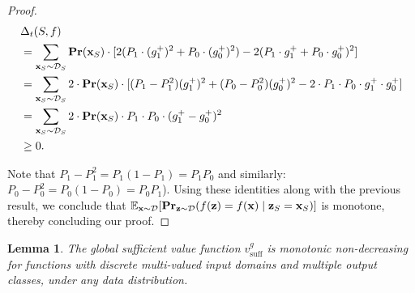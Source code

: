 \documentclass{article}
\newtheorem{lemma}{Lemma}
\newcommand{\z}{\textbf{z}}
\newcommand{\x}{\textbf{x}}
\newcommand{\fml}[1]{{\mathcal{#1}}}
\newcommand{\mbf}[1]{\ensuremath\mathbf{#1}}
\newcommand{\mbb}[1]{\ensuremath\mathbb{#1}}
\begin{document}
\begin{proof}
\begin{equation} \label{eq:gbx03}
\begin{aligned}
&\Delta_{t}(S,f) \\
&= \sum_{\x_{S} \sim \fml{D}_{S}} \mbf{Pr}(\x_{S} ) \cdot [2(P_{1} \cdot (g_{1}^{+})^2 + P_{0} \cdot (g_{0}^{+})^2) - 2(P_{1} \cdot g_{1}^{+} + P_{0} \cdot g_{0}^{+})^2] \\
&= \sum_{\x_{S} \sim \fml{D}_{S}} 2 \cdot \mbf{Pr}(\x_{S}) \cdot [(P_{1} - P_{1}^2) (g_{1}^{+})^2 + (P_{0} - P_{0}^2) (g_{0}^{+})^2 - 2 \cdot P_{1} \cdot P_{0} \cdot g_{1}^{+} \cdot g_{0}^{+}] \\
&= \sum_{\x_{S} \sim \fml{D}_{S}} 2 \cdot \mbf{Pr}(\x_{S}) \cdot P_{1} \cdot P_{0} \cdot (g_{1}^{+} - g_{0}^{+})^2 \\
&\ge 0.
\end{aligned}
\end{equation}


Note that $P_{1} - P_{1}^2 = P_{1}(1-P_{1}) = P_{1}P_{0}$ and similarly: $P_{0} - P_{0}^2 = P_{0}(1-P_{0}) = P_{0}P_{1}$).
Using these identities along with the previous result, we conclude that $\mbb{E}_{\x\sim \mathcal{D}}[\mbf{Pr}_{\z\sim \mathcal{D}}(f(\z) = f(\x) \mid \z_{S} = \x_{S})]$ is monotone, thereby concluding our proof.

\end{proof}


\begin{lemma} \label{lem:mfd}
The global sufficient value function $v^g_{\text{suff}}$
is monotonic non-decreasing for functions with discrete multi-valued input domains 
and multiple output classes, under any data distribution.
\end{lemma}
\end{document}
